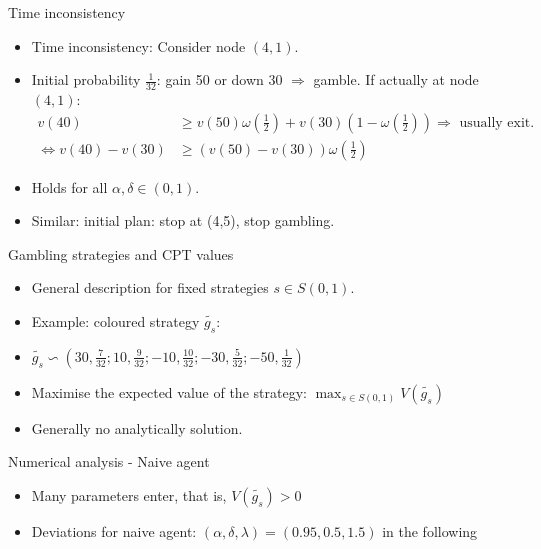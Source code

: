 \documentclass[11pt, aspectratio=169]{beamer}
\begin{document}
\begin{frame}{Time inconsistency}
    \begin{itemize}
        \item Time inconsistency: Consider node $(4,1)$.\medskip
        \item Initial probability $\frac{1}{32}$: gain 50 or down 30  $\Rightarrow$ gamble. If actually at node $(4,1)$:
        \begin{align*}v(40) &\geq v(50)\omega \left(\frac{1}{2}\right)+v(30)\left(1-\omega \left(\frac{1}{2}\right)\right) \Rightarrow \text{ usually exit.}\\
        \Leftrightarrow v(40)-v(30) &\geq (v(50)-v(30))\omega \left(\frac{1}{2}\right)\end{align*}
        \item Holds for all $\alpha, \delta \in (0,1)$.\medskip
        \item Similar: initial plan: stop at (4,5), stop gambling.\medskip
    \end{itemize}
\end{frame}


\begin{frame}{Gambling strategies and CPT values}
    \begin{itemize}
        \item General description for fixed strategies $s \in S(0,1)$.\bigskip
        \item Example: coloured strategy $\tilde{g_s}$:\bigskip
        \item $\tilde{g_s} \backsim \left(30,\frac{7}{32}; 10,\frac{9}{32}; -10, \frac{10}{32}; -30,\frac{5}{32};-50,\frac{1}{32} \right)  $\bigskip
        \item Maximise the expected value of the strategy: $\max_{s \in S(0,1)} V(\tilde{g_s})$\bigskip
        \item Generally no analytically solution.\bigskip
    \end{itemize}
\end{frame}

\begin{frame}{Numerical analysis - Naive agent}
    \begin{itemize}
        \item Many parameters enter, that is, $V(\tilde{g_s})>0 $\medskip
        \item Deviations for naive agent: $(\alpha,\delta,\lambda)=(0.95,0.5,1.5)$ in the following\medskip
    \end{itemize}
\end{frame}
\end{document}
